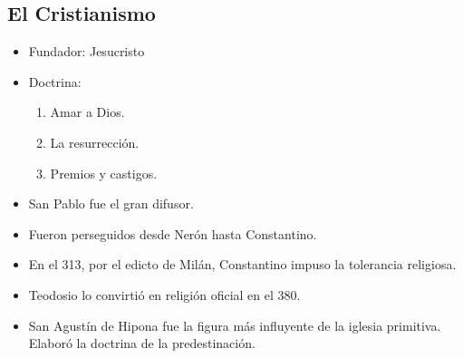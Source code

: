 \subsection{El Cristianismo}

\begin{itemize}

\item Fundador: Jesucristo

\item Doctrina:
\begin{enumerate}
	\item Amar a Dios.
	\item La resurrección.
	\item Premios y castigos.
\end{enumerate}

\item San Pablo fue el gran difusor.

\item Fueron perseguidos desde Nerón hasta Constantino.

\item En el 313, por el edicto de Milán, Constantino impuso la tolerancia religiosa.

\item Teodosio lo convirtió en religión oficial en el 380.

\item San Agustín de Hipona fue la figura más influyente de la iglesia primitiva.
Elaboró la doctrina de la predestinación.

\end{itemize}